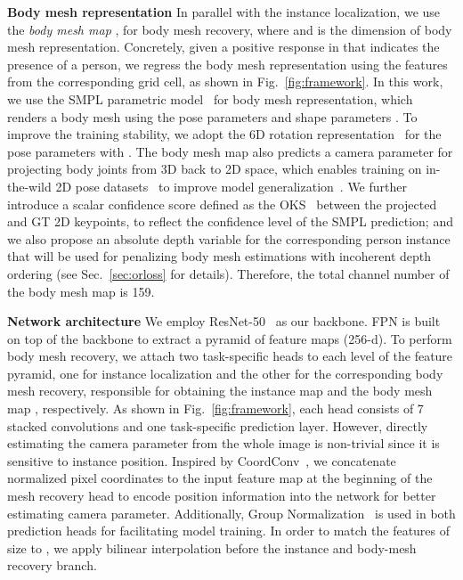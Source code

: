 \documentclass[final]{cvpr}
\newcommand{\myparagraph}[1]{{ \noindent \bf #1}}
\begin{document}
\myparagraph{Body mesh representation}
In parallel with the instance localization, we use the \emph{body mesh map} , for body mesh recovery, where  and  is the dimension of body mesh representation.
Concretely, given a positive response in  that indicates the presence of a person, we regress the body mesh representation using the features from the corresponding grid cell, as shown in Fig.~\ref{fig:framework}. 
In this work, we use the SMPL parametric model~\cite{loper2015smpl} for body mesh representation, which renders a body mesh using the   pose parameters  and shape parameters  . 
To improve the training stability, we adopt the 6D rotation representation~\cite{zhou2019continuity} for the pose parameters with . 
The body mesh map also predicts a camera parameter  for projecting body joints from 3D back to 2D space, which enables training on in-the-wild 2D pose datasets~\cite{johnson2010clustered,lin2014microsoft,andriluka20142d} to improve model generalization~\cite{hmrKanazawa17}.
We further introduce a scalar confidence score  defined as the OKS~\cite{girdhar2018detect} between the projected and GT 2D keypoints, to reflect the confidence level of the SMPL prediction; and we also propose an absolute depth variable  for the corresponding person instance that will be used for penalizing body mesh estimations with incoherent depth ordering (see  Sec.~\ref{sec:orloss} for details).  
Therefore, the total channel number of the body mesh map  is 159.

\myparagraph{Network architecture}
We employ ResNet-50~\cite{He_2016_CVPR} as our backbone. FPN is built on top of the backbone to extract a pyramid of feature maps (256-d). 
To perform body mesh recovery, we attach two task-specific heads to each level of the feature pyramid, one for instance localization and the other for the corresponding body mesh recovery, 
responsible for obtaining the instance map  and the body mesh map , respectively.
As shown in Fig.~\ref{fig:framework}, each head consists of 7 stacked  convolutions and one task-specific prediction layer.
However, directly estimating the camera parameter from the whole image is non-trivial since it is sensitive to instance position.
Inspired by CoordConv~\cite{liu2018intriguing}, we concatenate normalized pixel coordinates to the input feature map at the beginning of the mesh recovery head to encode position information into the network for better estimating camera parameter.
Additionally, Group Normalization~\cite{wu2018group} is used in both prediction heads for facilitating model training. 
In order to match the features of size  to , we apply bilinear interpolation before the instance and body-mesh recovery branch. 
\end{document}
